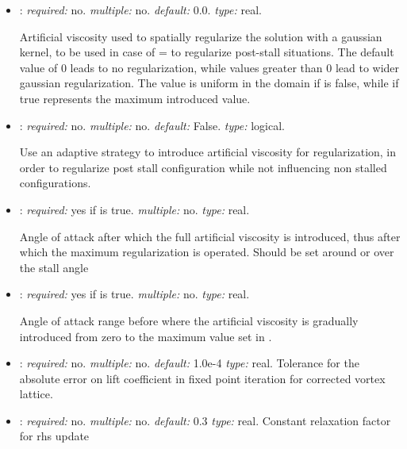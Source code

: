\begin{itemize}
\item {}: \textit{required:} no. 
\textit{multiple:} no. \textit{default:} 0.0. \textit{type:} real.

Artificial viscosity used to spatially regularize the solution with 
a gaussian kernel, to be used in case of  =  
to regularize post-stall situations. The default value of 0 leads to no 
regularization, while values greater than 0 lead to wider gaussian regularization. 
The value is uniform in the domain if  is 
false, while if true represents the maximum introduced value.

\item {}: \textit{required:} no. 
\textit{multiple:} no. \textit{default:} False. \textit{type:} logical.

Use an adaptive strategy to introduce artificial viscosity for regularization, 
in order to regularize post stall configuration while not influencing non 
stalled configurations. 

\item {}: \textit{required:} yes if 
 is true. \textit{multiple:} no. \textit{type:} real.

Angle of attack after which the full artificial viscosity is introduced, 
thus after which the maximum regularization is operated. Should be set 
around or over the stall angle

\item {}: \textit{required:} 
yes if  is true. \textit{multiple:} no. 
\textit{type:} real.

Angle of attack range before  
where the artificial viscosity is gradually introduced from zero to the maximum 
value set in .

\item {}: \textit{required:} no. \textit{multiple:} no. 
\textit{default:} 1.0e-4 \textit{type:} real. 
Tolerance for the absolute error on lift coefficient in fixed point 
iteration for corrected vortex lattice.

\item {}: \textit{required:} no. \textit{multiple:} no. 
\textit{default:} 0.3 \textit{type:} real. 
Constant relaxation factor for rhs update


\end{itemize}
